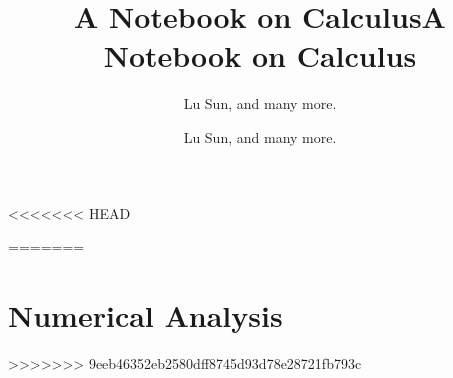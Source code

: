 <<<<<<< HEAD




\makeindex



\frontmatter

\title{A Notebook on Calculus}
\author{Lu Sun, and many more.}

\maketitle


\tableofcontents


\listoffigures
\listoftables

\mainmatter






















\printindex


=======




\makeindex



\frontmatter

\title{A Notebook on Calculus}
\author{Lu Sun, and many more.}

\maketitle


\tableofcontents


\listoffigures
\listoftables

\mainmatter



















\part{Numerical Analysis}








\printindex


>>>>>>> 9eeb46352eb2580dff8745d93d78e28721fb793c
